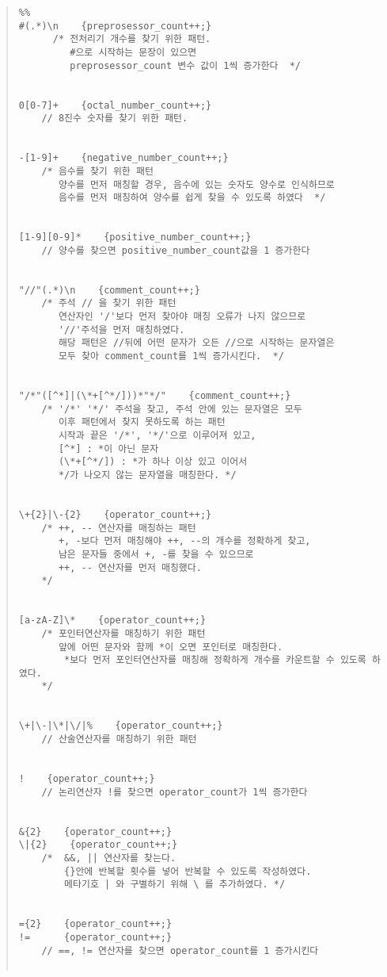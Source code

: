 \documentclass{article}
\begin{document}
\begin{quote}
\begin{verbatim}
%%
#(.*)\n    {preprosessor_count++;} 
      /* 전처리기 개수를 찾기 위한 패턴. 
         #으로 시작하는 문장이 있으면
         preprosessor_count 변수 값이 1씩 증가한다  */


0[0-7]+    {octal_number_count++;}
    // 8진수 숫자를 찾기 위한 패턴. 


-[1-9]+    {negative_number_count++;}
    /* 음수를 찾기 위한 패턴 
       양수를 먼저 매칭할 경우, 음수에 있는 숫자도 양수로 인식하므로 
       음수를 먼저 매칭하여 양수를 쉽게 찾을 수 있도록 하였다  */


[1-9][0-9]*    {positive_number_count++;}
    // 양수를 찾으면 positive_number_count값을 1 증가한다 


"//"(.*)\n    {comment_count++;}
    /* 주석 // 을 찾기 위한 패턴 
       연산자인 '/'보다 먼저 찾아야 매칭 오류가 나지 않으므로 
       '//'주석을 먼저 매칭하였다. 
       해당 패턴은 //뒤에 어떤 문자가 오든 //으로 시작하는 문자열은 
       모두 찾아 comment_count를 1씩 증가시킨다.  */


"/*"([^*]|(\*+[^*/]))*"*/"    {comment_count++;}
    /* '/*' '*/' 주석을 찾고, 주석 안에 있는 문자열은 모두 
       이후 패턴에서 찾지 못하도록 하는 패턴 
       시작과 끝은 '/*', '*/'으로 이루어져 있고,
       [^*] : *이 아닌 문자
       (\*+[^*/]) : *가 하나 이상 있고 이어서 
       */가 나오지 않는 문자열을 매칭한다. */


\+{2}|\-{2}    {operator_count++;}
    /* ++, -- 연산자를 매칭하는 패턴
       +, -보다 먼저 매칭해야 ++, --의 개수를 정확하게 찾고, 
       남은 문자들 중에서 +, -를 찾을 수 있으므로 
       ++, -- 연산자를 먼저 매칭했다. 
    */

  
[a-zA-Z]\*    {operator_count++;}
    /* 포인터연산자를 매칭하기 위한 패턴 
       앞에 어떤 문자와 함께 *이 오면 포인터로 매칭한다. 
        *보다 먼저 포인터연산자를 매칭해 정확하게 개수를 카운트할 수 있도록 하였다.
    */

  
\+|\-|\*|\/|%    {operator_count++;}
    // 산술연산자를 매칭하기 위한 패턴 


!    {operator_count++;}
    // 논리연산자 !를 찾으면 operator_count가 1씩 증가한다 
  
  
&{2}    {operator_count++;}
\|{2}    {operator_count++;}
    /*  &&, || 연산자를 찾는다.
        {}안에 반복할 횟수를 넣어 반복할 수 있도록 작성하였다. 
        메타기호 | 와 구별하기 위해 \ 를 추가하였다. */
  
  
={2}	{operator_count++;} 
!=      {operator_count++;}
    // ==, != 연산자를 찾으면 operator_count를 1 증가시킨다 
  

\end{verbatim}
\end{quote}
\end{document}
